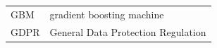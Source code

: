 \documentclass[information,article,accept,moreauthors,pdftex]{Definitions/mdpi}
\begin{document}
{{\begin{tabular}{@{}ll}
GBM & gradient boosting machine\\ %
GDPR & General Data Protection Regulation\\%
\end{tabular}


}}
\end{document}
